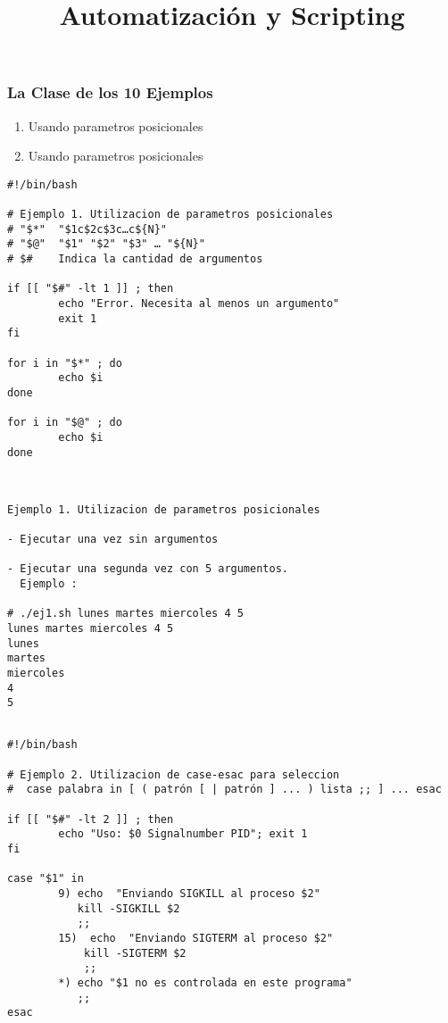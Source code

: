 \documentclass{beamer}
\title{Automatización y Scripting}
\begin{document}
\begin{frame}
  \titlepage

\end{frame}






\begin{frame}{}
\frametitle{La Clase de los 10 Ejemplos}
\begin{enumerate}
\item Usando parametros posicionales
\item Usando parametros posicionales
\end{enumerate}
\end{frame}{}



\begin{Verbatim}
#!/bin/bash

# Ejemplo 1. Utilizacion de parametros posicionales
# "$*"  "$1c$2c$3c…c${N}"
# "$@"  "$1" "$2" "$3" … "${N}"
# $#    Indica la cantidad de argumentos

if [[ "$#" -lt 1 ]] ; then
        echo "Error. Necesita al menos un argumento"
        exit 1
fi

for i in "$*" ; do
        echo $i
done

for i in "$@" ; do
        echo $i
done
\end{Verbatim}


\begin{Verbatim}


Ejemplo 1. Utilizacion de parametros posicionales

- Ejecutar una vez sin argumentos

- Ejecutar una segunda vez con 5 argumentos.
  Ejemplo : 

# ./ej1.sh lunes martes miercoles 4 5
lunes martes miercoles 4 5
lunes
martes
miercoles
4
5


\end{Verbatim}



\begin{Verbatim}
#!/bin/bash

# Ejemplo 2. Utilizacion de case-esac para seleccion
#  case palabra in [ ( patrón [ | patrón ] ... ) lista ;; ] ... esac

if [[ "$#" -lt 2 ]] ; then
        echo "Uso: $0 Signalnumber PID"; exit 1
fi

case "$1" in
        9) echo  "Enviando SIGKILL al proceso $2"
           kill -SIGKILL $2
           ;;
        15)  echo  "Enviando SIGTERM al proceso $2"
            kill -SIGTERM $2
            ;;
        *) echo "$1 no es controlada en este programa"
           ;;
esac
\end{Verbatim}
\end{document}
